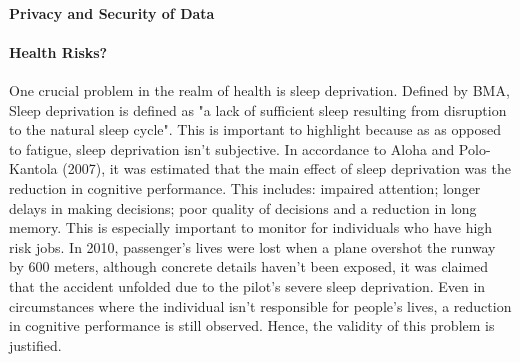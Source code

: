 \paragraph{Privacy and Security of Data}





\paragraph{Health Risks?}

One crucial problem in the realm of health is sleep deprivation. Defined by BMA, Sleep
deprivation is defined as "a lack of sufficient sleep resulting from disruption to the natural
sleep cycle". This is important to highlight because  as as opposed to fatigue,
sleep deprivation isn't subjective. In accordance to Aloha and Polo-Kantola (2007), it was estimated
that the main effect of sleep deprivation was the reduction in cognitive performance. This includes:
impaired attention; longer delays in making decisions; poor quality of decisions and a reduction in long memory.
This is especially important to monitor for individuals who have high risk jobs. In 2010,
passenger's lives were lost when a plane overshot the runway by 600 meters, although concrete details haven't been
exposed, it was claimed that the accident unfolded due to the pilot's severe sleep deprivation.
Even in circumstances where the individual isn't responsible for people's lives, a reduction in cognitive
performance is still observed. Hence, the validity of this problem is justified.
